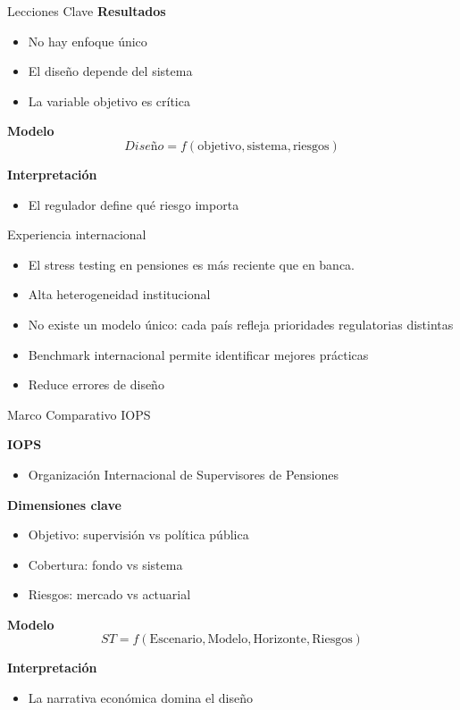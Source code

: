 \documentclass{beamer}
\begin{document}
\begin{frame}{Lecciones Clave}
\textbf{Resultados}
\begin{itemize}
\item No hay enfoque único
\item El diseño depende del sistema
\item La variable objetivo es crítica
\end{itemize}

\textbf{Modelo}
\[
Diseño = f(\text{objetivo}, \text{sistema}, \text{riesgos})
\]

\textbf{Interpretación}
\begin{itemize}
\item El regulador define qué riesgo importa
\end{itemize}
\end{frame}


\begin{frame}{Experiencia internacional}

\begin{itemize}
\item El stress testing en pensiones es más reciente que en banca.
\vspace{0.2cm}
\item Alta heterogeneidad institucional
\vspace{0.2cm}
\item No existe un modelo único: cada país refleja prioridades regulatorias distintas
\vspace{0.2cm}
\item Benchmark internacional permite identificar mejores prácticas
\vspace{0.2cm}
\item Reduce errores de diseño
\end{itemize}

\end{frame}

\begin{frame}{Marco Comparativo IOPS}

\textbf{IOPS}
\begin{itemize}
    \item Organizaci\'on Internacional de Supervisores de Pensiones
\end{itemize}

\textbf{Dimensiones clave}
\begin{itemize}
\item Objetivo: supervisión vs política pública
\item Cobertura: fondo vs sistema
\item Riesgos: mercado vs actuarial
\end{itemize}

\textbf{Modelo}
\[
ST = f(\text{Escenario}, \text{Modelo}, \text{Horizonte}, \text{Riesgos})
\]

\textbf{Interpretación}
\begin{itemize}
\item La narrativa económica domina el diseño
\end{itemize}
\end{frame}
\end{document}
